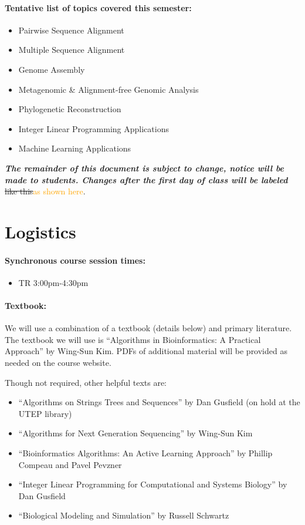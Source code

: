 \documentclass[12pt]{scrartcl}
\newcommand{\change}[2]{\sout{#1}\xspace\textcolor{orange}{#2}}
\begin{document}
\paragraph{Tentative list of topics covered this semester:}
\begin{itemize} 
\item Pairwise Sequence Alignment
\item Multiple Sequence Alignment
\item Genome Assembly
\item Metagenomic \& Alignment-free Genomic Analysis
\item Phylogenetic Reconstruction
\item Integer Linear Programming Applications
\item Machine Learning Applications
\end{itemize}

\textit{\textbf{The remainder of this document is subject to change, notice will be made to students. Changes after the first day of class will be labeled }}
\change{like this}{as  shown here}.

\tableofcontents

\clearpage
\section{Logistics}
\paragraph{Synchronous course session times:}
\begin{itemize}
\item TR 3:00pm-4:30pm
\end{itemize}


\paragraph{Textbook:} We will use a combination of a textbook (details below) and primary literature. 
The textbook we will use is ``Algorithms in Bioinformatics: A Practical Approach'' by Wing-Sun Kim. 
PDFs of additional material will be provided as needed on the course website. 

Though not required, other helpful texts are:
\begin{itemize}
\item ``Algorithms on Strings Trees and Sequences'' by Dan Gusfield (on hold at the UTEP library)
\item ``Algorithms for Next Generation Sequencing'' by Wing-Sun Kim
\item ``Bioinformatics Algorithms: An Active Learning Approach'' by Phillip Compeau and Pavel Pevzner 
\item ``Integer Linear Programming for Computational and Systems Biology'' by Dan Gusfield
\item ``Biological Modeling and Simulation'' by Russell Schwartz
\end{itemize}
\end{document}
